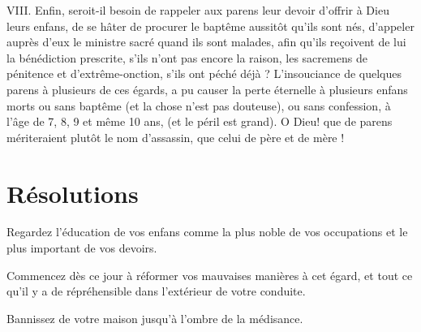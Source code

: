 \documentclass[instructions.tex]{subfiles}
\begin{document}
VIII. Enfin, seroit-il besoin de rappeler aux parens leur devoir d’offrir à Dieu leurs enfans, de se hâter de procurer le baptême aussitôt qu’ils sont nés, d’appeler auprès d’eux le ministre sacré quand ils sont malades, afin qu’ils reçoivent de lui la bénédiction prescrite, s’ils n’ont pas encore la raison, les sacremens de pénitence et d’extrême-onction, s’ils ont péché déjà ? L’insouciance de quelques parens à plusieurs de ces égards, a pu causer la perte éternelle à plusieurs enfans morts ou sans baptême (et la chose n’est pas douteuse), ou sans confession, à l’âge de 7, 8, 9 et même 10 ans, (et le péril est grand). O Dieu! que de parens mériteraient plutôt le nom d’assassin, que celui de père et de mère !
 
\section{Résolutions}
 
\primo Regardez l’éducation de vos enfans comme la plus noble de vos occupations et le plus important de vos devoirs. 

\secundo Commencez dès ce jour à réformer vos mauvaises manières à cet égard, et tout ce qu’il y a de répréhensible dans l’extérieur de votre conduite. 

\tertio Bannissez de votre maison jusqu’à l’ombre de la médisance. 

 
\end{document}
